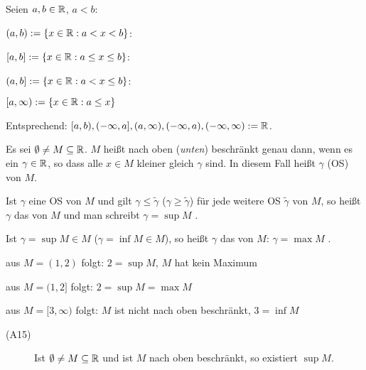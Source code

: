 \documentclass[a4paper,twoside,DIV15,BCOR12mm]{scrbook}
\begin{document}
\begin{definition}[Intervall]
Seien $a,b \in \mathbb{R}$, $a<b$:

\begin{liste}
\item $(a,b) := \{ x \in \mathbb{R}: a < x < b\} $: 
\item $[a,b] := \{ x \in \mathbb{R}: a \le x \le b\} $: 
\item $(a,b] := \{ x \in \mathbb{R}: a < x \le b\} $: 
\item $[a, \infty) := \{ x \in \mathbb{R}: a \le x \}$
\end{liste}

Entsprechend: $[a,b), (-\infty, a], (a, \infty), (-\infty, a), (-\infty, \infty) := \mathbb{R}$.
\end{definition}

\begin{definition}

Es sei $\emptyset \ne M \subseteq \mathbb{R}$. $M$ heißt nach oben (\textit{unten}) beschränkt genau dann, wenn es ein $\gamma \in \mathbb{R}$, so dass alle $x \in M$ kleiner gleich  $\gamma$ sind. In diesem Fall heißt $\gamma$  (OS)  von $M$.

Ist $\gamma$ eine OS  von $M$ und gilt $\gamma \le \tilde\gamma$ ($\gamma \ge \tilde\gamma$) für jede weitere OS  $\tilde\gamma$ von $M$, so heißt $\gamma$ das   von $M$ und man schreibt $\gamma = \sup{M}$ .

Ist $\gamma = \sup{M} \in M$ ($\gamma = \inf{M} \in M$), so heißt $\gamma$ das   von $M$: $\gamma = \max{M}$ .
\end{definition}

\begin{beispiele}
\item aus $M = (1,2)$ folgt: $2 = \sup{M}$, $M$ hat kein Maximum
\item aus $M = (1,2]$ folgt: $2 = \sup{M} = \max{M}$
\item aus $M = [3,\infty)$ folgt: $M$ ist nicht nach oben beschränkt, $3 = \inf{M}$
\end{beispiele}

\begin{axiom}
\begin{description}
\item[(A15)] Ist $\emptyset \ne M \subseteq \mathbb{R}$ und ist $M$ nach oben beschränkt, so existiert $\sup{M}$.
\end{description}
\end{axiom}
\end{document}
